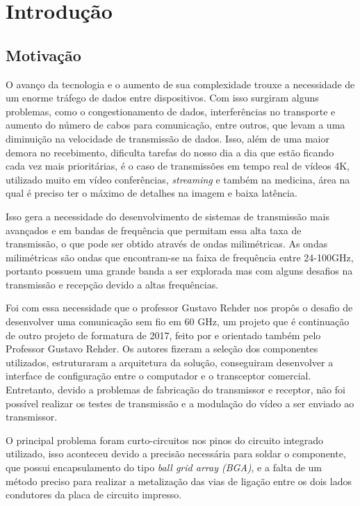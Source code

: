 \chapter{Introdução}

\section{Motivação}

O avanço da tecnologia e o aumento de sua complexidade trouxe a necessidade de um enorme tráfego de dados entre dispositivos. Com isso surgiram alguns problemas, como o congestionamento de dados, interferências no transporte e aumento do número de cabos para comunicação, entre outros, que levam a uma diminuição na velocidade de transmissão de dados. Isso, além de uma maior demora no recebimento, dificulta tarefas do nosso dia a dia que estão ficando cada vez mais prioritárias, é o caso de transmissões em tempo real de vídeos 4K, utilizado muito em vídeo conferências, \textit{streaming} e também na medicina, área na qual é preciso ter o máximo de detalhes na imagem e baixa latência.

Isso gera a necessidade do desenvolvimento de sistemas de transmissão mais avançados e em bandas de frequência que permitam essa alta taxa de transmissão, o que pode ser obtido através de ondas milimétricas. As ondas milimétricas são ondas que encontram-se na faixa de frequência entre 24-100GHz, portanto possuem uma grande banda a ser explorada mas com alguns desafios na transmissão e recepção devido a altas frequências. 

Foi com essa necessidade que o professor Gustavo Rehder nos propôs o desafio de desenvolver uma comunicação sem fio em 60 GHz, um projeto que é continuação de outro projeto de formatura de 2017, feito por \citeauthor{TCC} e orientado também pelo Professor Gustavo Rehder. Os autores fizeram a seleção dos componentes utilizados, estruturaram a arquitetura da solução, conseguiram desenvolver a interface de configuração entre o computador e o transceptor comercial. Entretanto, devido a problemas de fabricação do transmissor e receptor, não foi possível realizar os testes de transmissão e a modulação do vídeo a ser enviado ao transmissor.

O principal problema foram curto-circuitos nos pinos do circuito integrado utilizado, isso aconteceu devido a precisão necessária para soldar o componente, que possui encapsulamento do tipo \textit{ball grid array (BGA)}, e a falta de um método preciso para realizar a metalização das vias de ligação entre os dois lados condutores da placa de circuito impresso. 

